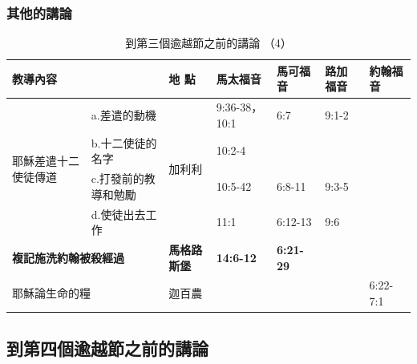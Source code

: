 \subsubsection{其他的講論} 
\begin{table}[htbp]
  \centering
    \begin{tabular}{|p{4.43em}|l|p{5.1em}|l|l|l|p{4.215em}|}
    \toprule
    \multicolumn{2}{|p{10.645em}|}{教導內容} & 地 點   & 馬太福音  & 馬可福音  & 路加福音  & 約翰福音 \\
\midrule
    \multirow{4}{*}{\parbox{0.08\textwidth}{耶穌差遣十二使徒傳道}} & \multicolumn{1}{p{10.215em}|}{a.差遣的動機} & \multirow{4}{*}{加利利} & \multicolumn{1}{p{5.355em}|}{9:36-38，10:1} & 6:7  & \multicolumn{1}{p{4.8em}|}{9:1-2} &  \\
\cmidrule{2-2}\cmidrule{4-7}    \multicolumn{1}{|l|}{} & \multicolumn{1}{p{10.215em}|}{b.十二使徒的名字} & \multicolumn{1}{c|}{} & \multicolumn{1}{p{5.355em}|}{10:2-4} &       &       &   \\
\cmidrule{2-2}\cmidrule{4-7}    \multicolumn{1}{|l|}{} & \multicolumn{1}{p{10.215em}|}{c.打發前的教導和勉勵} & \multicolumn{1}{c|}{} & \multicolumn{1}{p{5.355em}|}{10:5-42} & \multicolumn{1}{p{5.145em}|}{6:8-11} & \multicolumn{1}{p{5.285em}|}{9:3-5} &   \\
\cmidrule{2-2}\cmidrule{4-7}    \multicolumn{1}{|l|}{} & \multicolumn{1}{p{10.215em}|}{d.使徒出去工作} & \multicolumn{1}{c|}{} & 11:1 & \multicolumn{1}{p{5.145em}|}{6:12-13} & 9:6  &   \\
    \midrule
    \multicolumn{2}{|p{18.645em}|}{\textbf{複記施洗約翰被殺經過}} & \textbf{馬格路斯堡} & \multicolumn{1}{p{5.355em}|}{\textbf{14:6-12}} & \multicolumn{1}{p{5.145em}|}{\textbf{6:21-29}} &       & \multicolumn{1}{r|}{} \\
    \midrule
    \multicolumn{2}{|p{18.645em}|}{耶穌論生命的糧} & 迦百農   &       &       &       & 6:22-7:1 \\
    \bottomrule
    \end{tabular}%
     \caption{到第三個逾越節之前的講論 （4）}
  \label{tab:addlabel}%
\end{table}%

\subsection{到第四個逾越節之前的講論}
